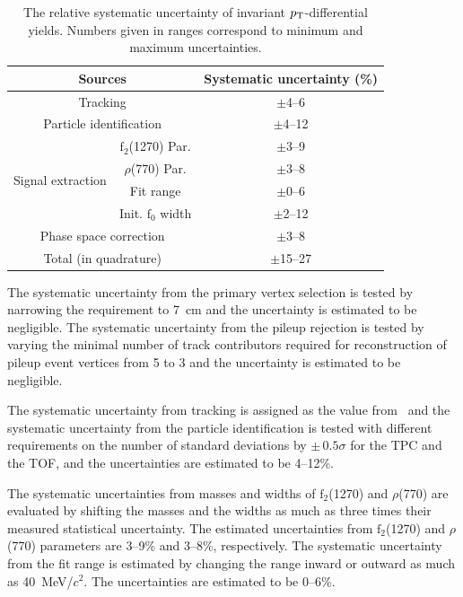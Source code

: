\begin{table}[h!]
\caption{The relative systematic uncertainty of invariant $p_{\rm{T}}$-differential yields. Numbers given in ranges correspond to minimum and maximum uncertainties.}
\centering
\begin{tabular}{cc|c}
\hline 
\multicolumn{2}{c|}{Sources}  &Systematic uncertainty (\%) \\ \hline
\multicolumn{2}{c|}{Tracking} & $\pm$4--6 \\
\multicolumn{2}{c|}{Particle identification} & $\pm$4--12 \\ 
\multirow{4}{*}{Signal extraction} &  $\mathrm{f}_{2}$(1270) Par.	& $\pm$3--9 \\ 
& $\rho$(770) Par. & $\pm$3--8 \\
& Fit range & $\pm$0--6 \\
& Init. $\mathrm{f}_{0}$ width & $\pm$2--12 \\
\multicolumn{2}{c|}{Phase space correction} & $\pm$3--8 \\ \hline 
\multicolumn{2}{c|}{Total (in quadrature)}	& $\pm$15--27 \\ 
\hline 
\end{tabular}
\label{tab:syst}
\end{table}

The systematic uncertainty from the primary vertex selection is tested by narrowing the requirement to 7~cm and the uncertainty is estimated to be negligible. The systematic uncertainty from the pileup rejection is tested by varying the minimal number of track contributors required for reconstruction of pileup event vertices from 5 to 3 and the uncertainty is estimated to be negligible.

The systematic uncertainty from tracking is assigned as the value from~\cite{ALICE:2013wgn} and the systematic uncertainty from the particle identification is tested with different requirements on the number of standard deviations by $\pm\,0.5\sigma$ for the TPC and the TOF, and the uncertainties are estimated to be 4--12\%.

The systematic uncertainties from masses and widths of $\mathrm{f}_{2}$(1270) and $\rho$(770) are evaluated by shifting the masses and the widths as much as three times their measured statistical uncertainty. The estimated uncertainties from $\mathrm{f}_{2}$(1270) and $\rho$(770) parameters are 3--9\% and 3--8\%, respectively. The systematic uncertainty from the fit range is estimated by changing the range inward or outward as much as 40~MeV/$c^{2}$. The uncertainties are estimated to be 0--6\%.

